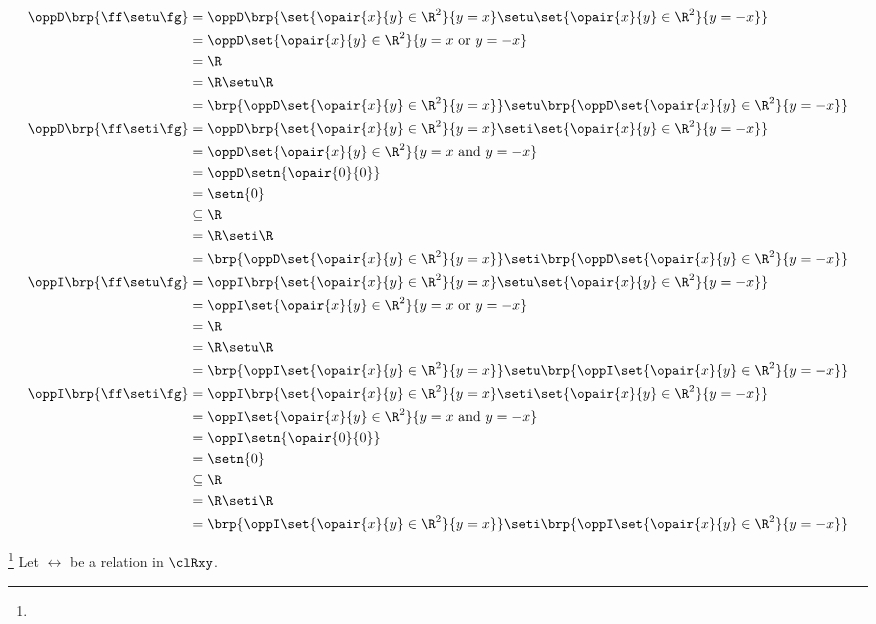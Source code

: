 {\begin{example}
\begin{align*}
  \oppD\brp{\ff\setu\fg} 
    &= \oppD\brp{\set{\opair{x}{y}\in\R^2}{y=x}\setu\set{\opair{x}{y}\in\R^2}{y=-x}}
  \\&= \oppD\set{\opair{x}{y}\in\R^2}{y=x\text{ or }y=-x}
  \\&= \R
  \\&= \R\setu\R
  \\&= \brp{\oppD\set{\opair{x}{y}\in\R^2}{y=x}}\setu\brp{\oppD\set{\opair{x}{y}\in\R^2}{y=-x}}
  \\
  \oppD\brp{\ff\seti\fg} 
    &= \oppD\brp{\set{\opair{x}{y}\in\R^2}{y=x}\seti\set{\opair{x}{y}\in\R^2}{y=-x}}
  \\&= \oppD\set{\opair{x}{y}\in\R^2}{y=x\text{ and }y=-x}
  \\&= \oppD\setn{\opair{0}{0}}
  \\&= \setn{0}
  \\&\subseteq \R
  \\&= \R\seti\R
  \\&= \brp{\oppD\set{\opair{x}{y}\in\R^2}{y=x}}\seti\brp{\oppD\set{\opair{x}{y}\in\R^2}{y=-x}}
  \\
  \oppI\brp{\ff\setu\fg} 
    &= \oppI\brp{\set{\opair{x}{y}\in\R^2}{y=x}\setu\set{\opair{x}{y}\in\R^2}{y=-x}}
  \\&= \oppI\set{\opair{x}{y}\in\R^2}{y=x\text{ or }y=-x}
  \\&= \R
  \\&= \R\setu\R
  \\&= \brp{\oppI\set{\opair{x}{y}\in\R^2}{y=x}}\setu\brp{\oppI\set{\opair{x}{y}\in\R^2}{y=-x}}
  \\
  \oppI\brp{\ff\seti\fg} 
    &= \oppI\brp{\set{\opair{x}{y}\in\R^2}{y=x}\seti\set{\opair{x}{y}\in\R^2}{y=-x}}
  \\&= \oppI\set{\opair{x}{y}\in\R^2}{y=x\text{ and }y=-x}
  \\&= \oppI\setn{\opair{0}{0}}
  \\&= \setn{0}
  \\&\subseteq \R
  \\&= \R\seti\R
  \\&= \brp{\oppI\set{\opair{x}{y}\in\R^2}{y=x}}\seti\brp{\oppI\set{\opair{x}{y}\in\R^2}{y=-x}}
\end{align*}
\end{example}





\begin{definition}
\label{def:R(A)}
\footnote{
  }
Let $\rel$ be a relation in $\clRxy$.
\end{definition}

}
